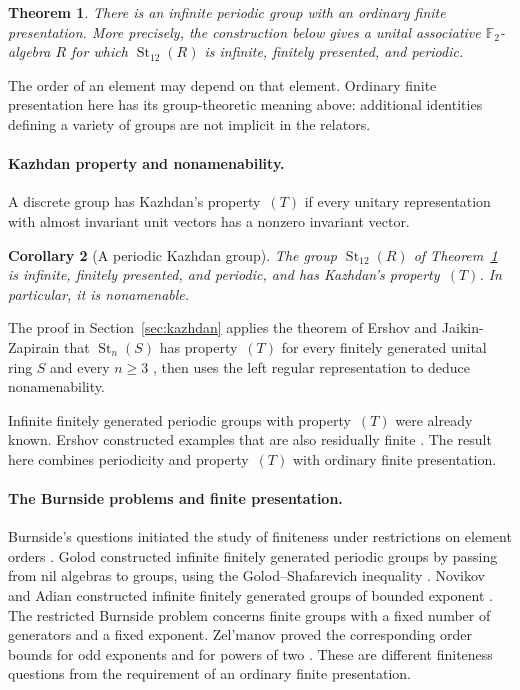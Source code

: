\documentclass[11pt]{article}
\numberwithin{equation}{section}
\newtheorem{theorem}{Theorem}[section]
\newtheorem{corollary}[theorem]{Corollary}
\theoremstyle{definition}
\theoremstyle{remark}
\newcommand{\F}{\mathbb F}
\DeclareMathOperator{\St}{St}
\begin{document}
\begin{theorem}\label{thm:main}
There is an infinite periodic group with an ordinary finite
presentation. More precisely, the construction below gives a unital
associative $\F_2$-algebra $R$ for which $\St_{12}(R)$ is infinite,
finitely presented, and periodic.
\end{theorem}

The order of an element may depend on that element. Ordinary finite
presentation here has its group-theoretic meaning above: additional
identities defining a variety of groups are not implicit in the relators.

\paragraph{Kazhdan property and nonamenability.}
A discrete group has Kazhdan's property~\((T)\) if every unitary
representation with almost invariant unit vectors has a nonzero invariant
vector.

\begin{corollary}[A periodic Kazhdan group]\label{cor:kazhdan}
The group \(\St_{12}(R)\) of Theorem~\ref{thm:main} is infinite,
finitely presented, and periodic, and has Kazhdan's property~\((T)\).
In particular, it is nonamenable.
\end{corollary}

The proof in Section~\ref{sec:kazhdan} applies the theorem of Ershov
and Jaikin-Zapirain that $\St_n(S)$ has property~$(T)$ for every
finitely generated unital ring $S$ and every $n\geq3$ \cite[Theorem~6.2]{ErshovJaikinZapirain2010},
then uses the left regular representation to deduce nonamenability.

Infinite finitely generated periodic groups with property~$(T)$ were
already known. Ershov constructed examples that are also residually
finite \cite[Proposition~8.4]{Ershov2008}. The result here combines
periodicity and property~$(T)$ with ordinary finite presentation.

\paragraph{The Burnside problems and finite presentation.}
Burnside's questions initiated the study of finiteness under restrictions
on element orders \cite{Burnside1902}. Golod constructed infinite
finitely generated periodic groups by passing from nil algebras to
groups, using the Golod--Shafarevich inequality
\cite{Golod1964,GolodShafarevich1964}. Novikov and Adian constructed
infinite finitely generated groups of bounded exponent
\cite{NovikovAdian1968}. The restricted Burnside problem concerns
finite groups with a fixed number of generators and a fixed exponent.
Zel'manov proved the corresponding order bounds for odd exponents and
for powers of two \cite{ZelmanovOdd,ZelmanovTwo}. These are
different finiteness questions from the requirement of an ordinary
finite presentation.
\end{document}
